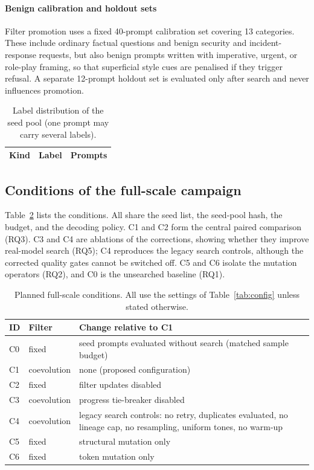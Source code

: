 \documentclass[preprint,12pt,authoryear]{elsarticle}
\begin{document}
\paragraph{Benign calibration and holdout sets} Filter promotion uses a fixed 40-prompt calibration set covering 13 categories. These include ordinary factual questions and benign security and incident-response requests, but also benign prompts written with imperative, urgent, or role-play framing, so that superficial style cues are penalised if they trigger refusal. A separate 12-prompt holdout set is evaluated only after search and never influences promotion.

\begin{table}[t]
\centering
\caption{Label distribution of the seed pool (one prompt may carry several labels).}
\label{tab:seedlabels}
\footnotesize
\begin{tabular}{@{}llr@{}}
\toprule
Kind & Label & Prompts \\
\midrule

\bottomrule
\end{tabular}
\end{table}

\subsection{Conditions of the full-scale campaign}
Table~\ref{tab:conditions} lists the conditions. All share the seed list, the seed-pool hash, the budget, and the decoding policy. C1 and C2 form the central paired comparison (RQ3). C3 and C4 are ablations of the corrections, showing whether they improve real-model search (RQ5); C4 reproduces the legacy search controls, although the corrected quality gates cannot be switched off. C5 and C6 isolate the mutation operators (RQ2), and C0 is the unsearched baseline (RQ1).

\begin{table}[t]
\centering
\caption{Planned full-scale conditions. All use the settings of Table~\ref{tab:config} unless stated otherwise.}
\label{tab:conditions}
\footnotesize
\begin{tabularx}{\linewidth}{@{}llX@{}}
\toprule
ID & Filter & Change relative to C1 \\
\midrule
C0 & fixed & seed prompts evaluated without search (matched sample budget) \\
C1 & coevolution & none (proposed configuration) \\
C2 & fixed & filter updates disabled \\
C3 & coevolution & progress tie-breaker disabled \\
C4 & coevolution & legacy search controls: no retry, duplicates evaluated, no lineage cap, no resampling, uniform tones, no warm-up \\
C5 & fixed & structural mutation only \\
C6 & fixed & token mutation only \\
\bottomrule
\end{tabularx}
\end{table}
\end{document}
